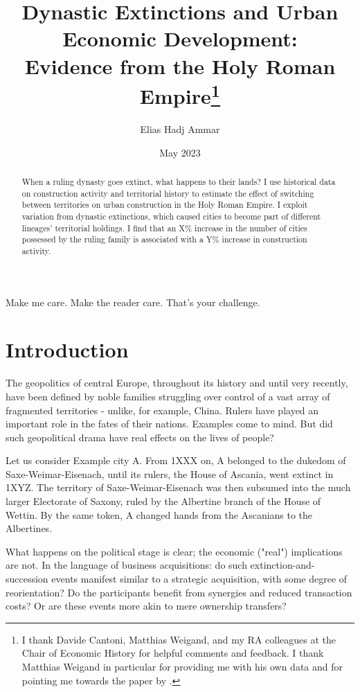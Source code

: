 \documentclass{article}
\title{Dynastic Extinctions and Urban Economic Development: \\Evidence from the Holy Roman Empire\footnote{I thank Davide Cantoni, Matthias Weigand, and my RA colleagues at the Chair of Economic History for helpful comments and feedback. I thank Matthias Weigand in particular for providing me with his own data and for pointing me towards the paper by \cite{schoenholzer2018}.}
}
\author{Elias Hadj Ammar}
\date{May 2023}
\begin{document}
\onehalfspacing
\maketitle
\thispagestyle{empty}

\begin{abstract}
When a ruling dynasty goes extinct, what happens to their lands? I use historical data on construction activity and territorial history to estimate the effect of switching between territories on urban construction in the Holy Roman Empire. I exploit variation from dynastic extinctions, which caused cities to become part of different lineages' territorial holdings. I find that an X\% increase in the number of cities possessed by the ruling family is associated with a Y\% increase in construction activity.
\end{abstract}




\newpage

\setcounter{page}{1}
\doublespacing

 
Make me care.
Make the reader care. That's your challenge.



\section{Introduction}

The geopolitics of central Europe, throughout its history and until very recently, have been defined by noble families struggling over control of a vast array of fragmented territories - unlike, for example, China. Rulers have played an important role in the fates of their nations. Examples come to mind. But did such geopolitical drama have real effects on the lives of people? 

Let us consider Example city A. From 1XXX on, A belonged to the dukedom of Saxe-Weimar-Eisenach, until its rulers, the House of Ascania, went extinct in 1XYZ. The territory of Saxe-Weimar-Eisenach was then subsumed into the much larger Electorate of Saxony, ruled by the Albertine branch of the House of Wettin. By the same token, A changed hands from the Ascanians to the Albertines.

What happens on the political stage is clear; the economic ("real") implications are not. In the language of business acquisitions: do such extinction-and-succession events manifest similar to a strategic acquisition, with some degree of reorientation? Do the participants benefit from synergies and reduced transaction costs? Or are these events more akin to mere ownership transfers?
\end{document}
